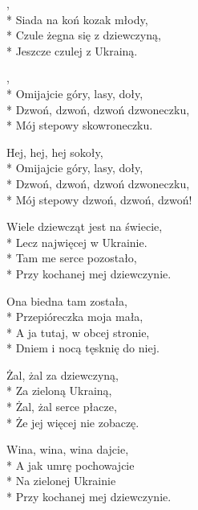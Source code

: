 \begin{lyrics}[longestline={Hej, tam gdzieś znad czarnej wody,}]

,\\*
Siada na koń kozak młody,\\*
Czule żegna się z dziewczyną,\\*
Jeszcze czulej z Ukrainą.

\begin{chorus}
,\\*
Omijajcie góry, lasy, doły,\\*
Dzwoń, dzwoń, dzwoń dzwoneczku,\\*
Mój stepowy skowroneczku.

Hej, hej, hej sokoły,\\*
Omijajcie góry, lasy, doły,\\*
Dzwoń, dzwoń, dzwoń dzwoneczku,\\*
Mój stepowy dzwoń, dzwoń, dzwoń!
\end{chorus}

Wiele dziewcząt jest na świecie,\\*
Lecz najwięcej w Ukrainie.\\*
Tam me serce pozostało,\\*
Przy kochanej mej dziewczynie.

\chorusref

Ona biedna tam została,\\*
Przepióreczka moja mała,\\*
A ja tutaj, w obcej stronie,\\*
Dniem i nocą tęsknię do niej.

\chorusref

Żal, żal za dziewczyną,\\*
Za zieloną Ukrainą,\\*
Żal, żal serce płacze,\\*
Że jej więcej nie zobaczę.

\chorusref

Wina, wina, wina dajcie,\\*
A jak umrę pochowajcie\\*
Na zielonej Ukrainie\\*
Przy kochanej mej dziewczynie.
\end{lyrics}




